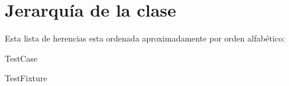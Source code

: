 \section{Jerarquía de la clase}
Esta lista de herencias esta ordenada aproximadamente por orden alfabético\+:\begin{DoxyCompactList}
\item {}
\item {}
\item Test\+Case\begin{DoxyCompactList}
\item {}
\end{DoxyCompactList}
\item Test\+Fixture\begin{DoxyCompactList}
\item {}
\end{DoxyCompactList}
\end{DoxyCompactList}
